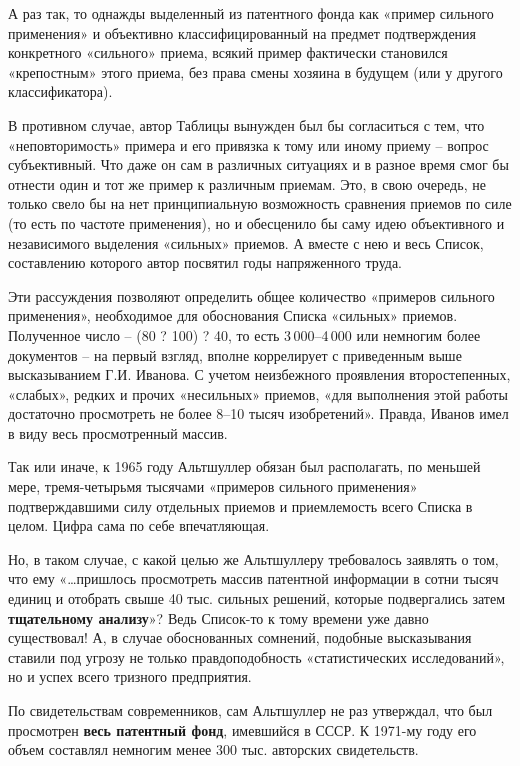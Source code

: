 \documentclass[11pt,a4paper]{article}
\begin{document}
А раз так, то однажды выделенный из патентного фонда как «пример сильного
применения» и объективно классифицированный на предмет подтверждения
конкретного «сильного» приема, всякий пример фактически становился
«крепостным» этого приема, без права смены хозяина в будущем (или у другого
классификатора).

В противном случае, автор Таблицы вынужден был бы согласиться с тем, что
«неповторимость» примера и его привязка к тому или иному приему -- вопрос
субъективный. Что даже он сам в различных ситуациях и в разное время смог бы
отнести один и тот же пример к различным приемам. Это, в свою очередь, не
только свело бы на нет принципиальную возможность сравнения приемов по силе
(то есть по частоте применения), но и обесценило бы саму идею объективного и
независимого выделения «сильных» приемов. А вместе с нею и весь Список,
составлению которого автор посвятил годы напряженного труда.

Эти рассуждения позволяют определить общее количество «примеров сильного
применения», необходимое для обоснования Списка «сильных» приемов. Полученное
число -- (80 ? 100) ? 40, то есть 3\,000--4\,000 или немногим более документов
-- на первый взгляд, вполне коррелирует с приведенным выше высказыванием
Г.И. Иванова. С учетом неизбежного проявления второстепенных, «слабых», редких
и прочих «несильных» приемов, «для выполнения этой работы достаточно
просмотреть не более 8--10 тысяч изобретений». Правда, Иванов имел в виду весь
просмотренный массив.

Так или иначе, к 1965 году Альтшуллер обязан был располагать, по меньшей мере,
тремя-четырьмя тысячами «примеров сильного применения» подтверждавшими силу
отдельных приемов и приемлемость всего Списка в целом. Цифра сама по себе
впечатляющая.

Но, в таком случае, с какой целью же Альтшуллеру требовалось заявлять о том,
что ему «…пришлось просмотреть массив патентной информации в сотни тысяч
единиц и отобрать свыше 40 тыс. сильных решений, которые подвергались затем
\textbf{тщательному анализу}»? Ведь Список-то к тому времени уже давно
существовал! А, в случае обоснованных сомнений, подобные высказывания ставили
под угрозу не только правдоподобность «статистических исследований», но и
успех всего тризного предприятия.

По свидетельствам современников, сам Альтшуллер не раз утверждал, что был
просмотрен \textbf{весь патентный фонд}, имевшийся в СССР. К 1971-му году его
объем составлял немногим менее 300 тыс. авторских свидетельств.
\end{document}

